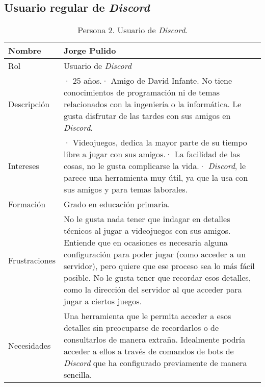 \bigskip
\bigskip
\bigskip
\pagebreak


\subsection{Usuario regular de \textit{Discord}}
\label{sec:personaUsuarioDiscord}
\FloatBarrier
\begin{table}[h]
    \centering
    \def\arraystretch{1.25}
    \begin{adjustbox}{max width=\textwidth}
    \begin{tabularx}{\textwidth}{|l|L|}
    \hline
        \textbf{Nombre} & \textbf{Jorge Pulido} \\ \hline
    \hline
        Rol & Usuario de \textit{Discord} \\ \hline
        Descripción & · 25 años.\linebreak · Amigo de David Infante. No tiene conocimientos de programación ni de temas relacionados con la ingeniería o la informática. Le gusta disfrutar de las tardes con sus amigos en \textit{Discord}. \\ \hline
        Intereses & · Videojuegos, dedica la mayor parte de su tiempo libre a jugar con sus amigos.\linebreak · La facilidad de las cosas, no le gusta complicarse la vida.\linebreak · \textit{Discord}, le parece una herramienta muy útil, ya que la usa con sus amigos y para temas laborales. \\ \hline
        Formación & Grado en educación primaria. \\ \hline
        Frustraciones & No le gusta nada tener que indagar en detalles técnicos al jugar a videojuegos con sus amigos. Entiende que en ocasiones es necesaria alguna configuración para poder jugar (como acceder a un servidor), pero quiere que ese proceso sea lo más fácil posible. No le gusta tener que recordar esos detalles, como la dirección del servidor al que acceder para jugar a ciertos juegos. \\ \hline
        Necesidades & Una herramienta que le permita acceder a esos detalles sin preocuparse de recordarlos o de consultarlos de manera extraña. Idealmente podría acceder a ellos a través de comandos de bots de \textit{Discord} que ha configurado previamente de manera sencilla. \\ \hline
    \end{tabularx}
    \end{adjustbox}
    \caption{Persona 2. Usuario de \textit{Discord}.}
\end{table}
\FloatBarrier
\bigskip
\bigskip
\bigskip
\bigskip
\bigskip
\pagebreak

